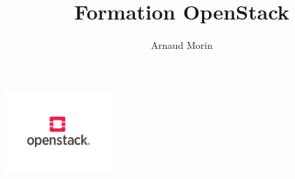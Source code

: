 \usepackage[utf8]{inputenc}
\usepackage{graphicx}
\usepackage{xparse}
\usepackage{microtype}
\usepackage{verbatim}
\usepackage[french]{babel}


\title{Formation OpenStack}
\author{Arnaud Morin}
\date{}





  \begin{frame}
    \titlepage
    \begin{center}
      \includegraphics[width=4cm]{images/openstack.png}
    \end{center}
  \end{frame}

